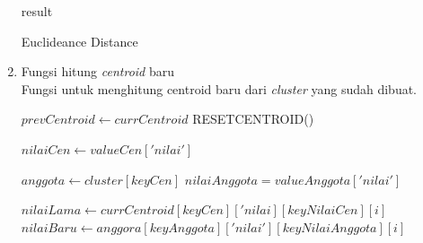 \begin{enumerate}
\begin{algorithm}[H]
\begin{algorithmic}[1]
                    \State \Return result
                \EndProcedure
            \end{algorithmic} 
            \caption{Euclideance Distance}
            \label{alg:euclideanceDistance}
        \end{algorithm}
    
    \item Fungsi hitung \textit{centroid} baru \\
        Fungsi untuk menghitung centroid baru dari \textit{cluster} yang sudah dibuat. \\
        
        \begin{algorithm}[H]
            \begin{algorithmic}[1]
                    \State $prevCentroid \gets currCentroid$
                    \State RESETCENTROID()
                    
                        \State $nilaiCen \gets valueCen['nilai']$
                        
                            \State $anggota \gets cluster[keyCen]$
                                    \State $nilaiAnggota = valueAnggota['nilai']$
                                    
                                                \State $nilaiLama \gets currCentroid[keyCen]['nilai][keyNilaiCen][i]$
                                                \State $nilaiBaru \gets anggora[keyAnggota]['nilai'][keyNilaiAnggota][i]$
                                                

\end{algorithmic}
\end{algorithm}
\end{enumerate}
